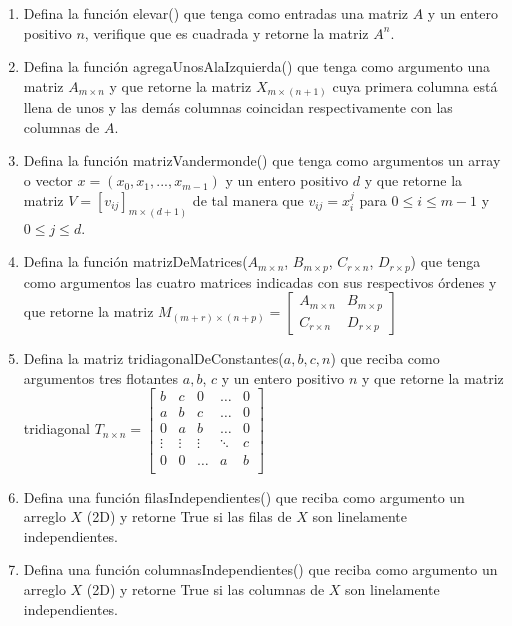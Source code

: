 \documentclass{article}
\begin{document}
\begin{enumerate}
\item Defina la funci\'on elevar() que tenga como entradas una matriz $A$ y un entero positivo $n$, verifique que es cuadrada y retorne la matriz $A^{n}$.

\item Defina la funci\'on agregaUnosAlaIzquierda() que tenga como argumento una matriz $A _{m\times  n } $ y que retorne la matriz $X _{ m\times (n+1)} $ cuya primera columna est\'a llena de unos y las dem\'as columnas coincidan respectivamente con las columnas de $A$. 

\item Defina la funci\'on matrizVandermonde() que tenga como argumentos un array o vector $x=(x _{ 0}, x _{ 1}  , ..., x _{ m-1} )$ y un entero positivo $d$ y que retorne la matriz $V = [v _{ ij} ] _{ m\times (d+1)} $ de tal manera que $v _{ ij}= x _{ i} ^{ j}  $ para $0\leq i \leq m-1$ y $0\leq j\leq d$.

\item Defina la funci\'on matrizDeMatrices($A _{ m\times n} $, $B _{ m\times p} $, $C _{ r\times n} $, $D _{ r\times p} $) que tenga como argumentos las cuatro matrices indicadas con sus respectivos \'ordenes y que retorne la matriz $M _{ (m+r)\times (n+p)}  = \begin{bmatrix}
A _{ m\times n} & B _{ m\times p} \\ C _{ r\times n} & D _{ r\times p}
\end{bmatrix}$

\item Defina la matriz tridiagonalDeConstantes($a,b,c, n$) que reciba como argumentos tres flotantes $a, b$, $c$ y un entero positivo $n$ y que retorne la matriz tridiagonal $T_{n\times n} = \begin{bmatrix}
b &c &0 &\dots &0\\
a &b &c &\dots &0\\
0 &a &b &\dots &0\\
\vdots &\vdots &\vdots &\ddots &c\\
0 &0 &\dots &a &b\\
\end{bmatrix}$

\item Defina una funci\'on filasIndependientes() que reciba como argumento un arreglo $X$ (2D) y retorne True si las filas de $X$ son linelamente independientes.


\item Defina una funci\'on columnasIndependientes() que reciba como argumento un arreglo $X$ (2D) y retorne True si las columnas de $X$ son linelamente independientes.


\end{enumerate}
\end{document}
